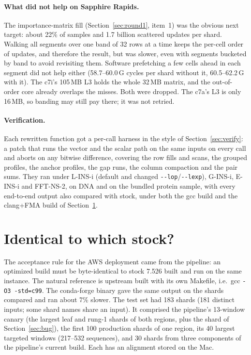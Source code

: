 \documentclass[11pt]{article}
\newcommand{\code}[1]{\texttt{#1}}
\begin{document}
\paragraph{What did not help on Sapphire Rapids.} The importance-matrix fill
(Section~\ref{sec:round1}, item~1) was the obvious next target: about 22\% of samples and
1.7 billion scattered updates per shard. Walking all segments over one band of 32 rows at a
time keeps the per-cell order of updates, and therefore the result, but was slower, even
with segments bucketed by band to avoid revisiting them. Software prefetching a few cells
ahead in each segment did not help either (58.7--60.0\,G cycles per shard without it,
60.5--62.2\,G with it). The c7i's 105\,MB
L3 holds the whole 32\,MB matrix, and the out-of-order core already overlaps the misses.
Both were dropped. The c7a's L3 is only 16\,MB, so banding may still pay there; it was not
retried.

\paragraph{Verification.} Each rewritten function got a per-call harness in the style of
Section~\ref{sec:verify}: a patch that runs the vector and the scalar path on the same
inputs on every call and aborts on any bitwise difference, covering the row fills and scans,
the grouped profiles, the anchor profiles, the gap runs, the column compaction and the pair
sums. They ran under L-INS-i (default and changed \code{-{}-lop}/\code{-{}-lexp}), G-INS-i,
E-INS-i and FFT-NS-2, on DNA and on the bundled protein sample, with every end-to-end
output also compared with stock, under both the gcc build and the clang+FMA build of
Section~\ref{sec:xplat}.

\section{Identical to which stock?}
\label{sec:xplat}

The acceptance rule for the AWS deployment came from the pipeline: an optimized build must
be byte-identical to stock 7.526 built and run on the same instance. The natural reference is
upstream built with its own Makefile, i.e.\ gcc \code{-O3 -std=c99}. The conda-forge binary
gave the same output on the shards compared and ran about 7\% slower. The test set had 183
shards (181 distinct inputs; some shard names share an input). It comprised the pipeline's
13-window canary (the largest leaf and rung-1 shards of both regions, plus the shard of
Section~\ref{sec:bug}), the first 100 production shards of one region, its 40 largest targeted
windows (217--532 sequences), and 30 shards from three components of the pipeline's current build.
Each has an alignment stored on the Mac.
\end{document}
